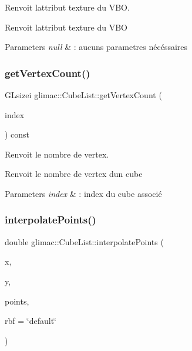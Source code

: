 Renvoit l\textquotesingle{}attribut texture du V\+BO. 

Renvoit l\textquotesingle{}attribut texture du V\+BO


\begin{DoxyParams}{Parameters}
{\em null} & \+: aucuns parametres nécéssaires \\
\hline
\end{DoxyParams}
\mbox{\label{classglimac_1_1CubeList_a5f1ea621736982934d8672771d42406f}} 
\subsubsection{\texorpdfstring{get\+Vertex\+Count()}{getVertexCount()}}
{\footnotesize\ttfamily G\+Lsizei glimac\+::\+Cube\+List\+::get\+Vertex\+Count (\begin{DoxyParamCaption}\item[{int}]{index }\end{DoxyParamCaption}) const\hspace{0.3cm}{\ttfamily [inline]}}



Renvoit le nombre de vertex. 

Renvoit le nombre de vertex d\textquotesingle{}un cube


\begin{DoxyParams}{Parameters}
{\em index} & \+: index du cube associé \\
\hline
\end{DoxyParams}
\mbox{\label{classglimac_1_1CubeList_a183afd5d85506f957281c7092d5b5776}} 
\subsubsection{\texorpdfstring{interpolate\+Points()}{interpolatePoints()}}
{\footnotesize\ttfamily double glimac\+::\+Cube\+List\+::interpolate\+Points (\begin{DoxyParamCaption}\item[{double}]{x,  }\item[{double}]{y,  }\item[{Eigen\+::\+Matrix\+Xd}]{points,  }\item[{std\+::string}]{rbf = {\ttfamily \char`\"{}default\char`\"{}} }\end{DoxyParamCaption})}



